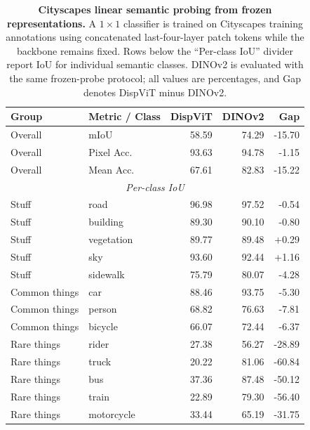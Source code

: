 \begin{table}[!t]
    \centering
    \caption{\textbf{Cityscapes linear semantic probing from frozen representations.}
    A $1 \times 1$ classifier is trained on Cityscapes training annotations using concatenated last-four-layer patch tokens while the backbone remains fixed.
    Rows below the ``Per-class IoU'' divider report IoU for individual semantic classes.
    DINOv2 is evaluated with the same frozen-probe protocol; all values are percentages, and Gap denotes DispViT minus DINOv2.}
    \label{tab:semantic_linear_probe}
    \small
    \setlength{\tabcolsep}{6pt}
    \renewcommand{\arraystretch}{1.05}
    \begin{tabular*}{\textwidth}{@{\extracolsep{\fill}}llrrr@{}}
        \toprule
        \textbf{Group} & \textbf{Metric / Class} & \textbf{DispViT} & \textbf{DINOv2} & \textbf{Gap} \\
        \midrule
        Overall & mIoU & 58.59 & 74.29 & -15.70 \\
        Overall & Pixel Acc. & 93.63 & 94.78 & -1.15 \\
        Overall & Mean Acc. & 67.61 & 82.83 & -15.22 \\
        \midrule
        \multicolumn{5}{c}{\emph{Per-class IoU}} \\
        \midrule
        Stuff & road & 96.98 & 97.52 & -0.54 \\
        Stuff & building & 89.30 & 90.10 & -0.80 \\
        Stuff & vegetation & 89.77 & 89.48 & +0.29 \\
        Stuff & sky & 93.60 & 92.44 & +1.16 \\
        Stuff & sidewalk & 75.79 & 80.07 & -4.28 \\
        \midrule
        Common things & car & 88.46 & 93.75 & -5.30 \\
        Common things & person & 68.82 & 76.63 & -7.81 \\
        Common things & bicycle & 66.07 & 72.44 & -6.37 \\
        \midrule
        Rare things & rider & 27.38 & 56.27 & -28.89 \\
        Rare things & truck & 20.22 & 81.06 & -60.84 \\
        Rare things & bus & 37.36 & 87.48 & -50.12 \\
        Rare things & train & 22.89 & 79.30 & -56.40 \\
        Rare things & motorcycle & 33.44 & 65.19 & -31.75 \\
        \bottomrule
    \end{tabular*}
\end{table}

